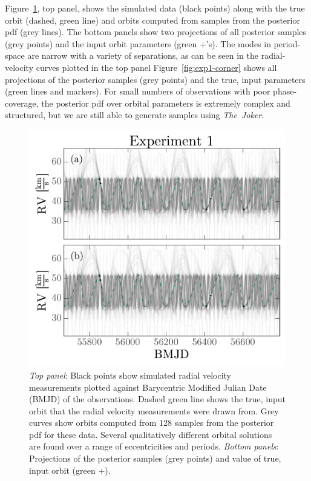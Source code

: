 \documentclass[manuscript, letterpaper]{aastex6}
\newcommand{\project}[1]{\textsl{#1}}
\newcommand{\samplername}{\project{The~Joker}}
\newcommand{\figname}{Figure}
\begin{document}
\figname~\ref{fig:exp1-rv}, top panel, shows the simulated data (black points)
along with the true orbit (dashed, green line) and orbits computed from samples
from the posterior pdf (grey lines).
The bottom panels show two projections of all posterior samples (grey points)
and the input orbit parameters (green +'s).
The modes in period-space are narrow with a variety of separations, as can be
seen in the radial-velocity curves plotted in the top panel
\figname~\ref{fig:exp1-corner} shows all projections of the posterior samples
(grey points) and the true, input parameters (green lines and markers).
For small numbers of observations with poor phase-coverage, the posterior pdf
over orbital parameters is extremely complex and structured, but we are still
able to generate samples using \samplername.

\begin{figure}[p]
\begin{center}
\includegraphics[width=\textwidth]{figures/exp1-rv-curves.pdf}
\end{center}
\caption{%
{\sl Top panel}: Black points show simulated radial velocity measurements
plotted against Barycentric Modified Julian Date (BMJD) of the observations.
Dashed green line shows the true, input orbit that the radial velocity
measurements were drawn from.
Grey curves show orbits computed from 128 samples from the posterior pdf for
these data.
Several qualitatively different orbital solutions are found over a range of
eccentricities and periods.
{\sl Bottom panels}: Projections of the posterior samples (grey points) and
value of true, input orbit (green +).
\label{fig:exp1-rv}}
\end{figure}
\end{document}
